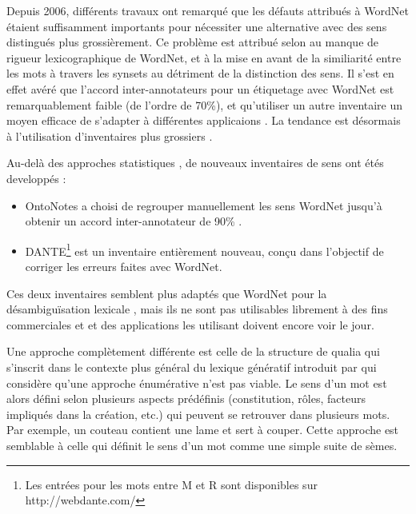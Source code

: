 
Depuis 2006, différents travaux \citep{navigli2007semeval,hovy2006ontonotes}
ont remarqué que les défauts attribués à WordNet
\citep{snow2007learning,ide2007making} étaient suffisamment importants pour
nécessiter une alternative avec des sens distingués plus grossièrement. Ce
problème est attribué selon \cite{edmonds2002introduction} au manque de rigueur
lexicographique de WordNet, et à la mise en avant de la similiarité entre les
mots à travers les synsets au détriment de la distinction des sens. Il s'est en
effet avéré que l'accord inter-annotateurs pour un étiquetage avec WordNet est
remarquablement faible (de l'ordre de 70\%), et qu'utiliser un autre inventaire
un moyen efficace de s'adapter à différentes applicaions
\citep{palmer2004different}. La tendance est désormais à l'utilisation
d'inventaires plus grossiers \citep{navigli2007semeval,navigli2012quick}.


Au-delà des approches statistiques \citep{snow2007learning}, de nouveaux
inventaires de sens ont étés developpés :

\begin{itemize}

    \item OntoNotes \citep{hovy2006ontonotes} a choisi de regrouper
        manuellement les sens WordNet jusqu'à obtenir un accord
        inter-annotateur de 90\% .

    \item DANTE\footnote{Les entrées pour les mots entre M et R sont
        disponibles sur http://webdante.com/} \citep{mccarthy2010dante} est un
        inventaire entièrement nouveau, conçu dans l'objectif de corriger les
        erreurs faites avec WordNet\citep{kilgarriff2010detailed}.


\end{itemize}

Ces deux inventaires semblent plus adaptés que WordNet pour la désambiguïsation
lexicale \citep{navigli2012quick}, mais ils ne sont pas utilisables librement à
des fins commerciales et et des applications les utilisant doivent encore voir
le jour.

Une approche complètement différente est celle de la structure de qualia
\citep{johnston1996qualia} qui s'inscrit dans le contexte plus général du
lexique génératif introduit par \cite{pustejovsky1991generative} qui considère
qu'une approche énumérative n'est pas viable. Le sens d'un mot est alors défini
selon plusieurs aspects prédéfinis (constitution, rôles, facteurs impliqués
dans la création, etc.) qui peuvent se retrouver dans plusieurs mots. Par
exemple, un couteau contient une lame et sert à couper. Cette approche est
semblable à celle qui définit le sens d'un mot comme une simple suite de sèmes.

